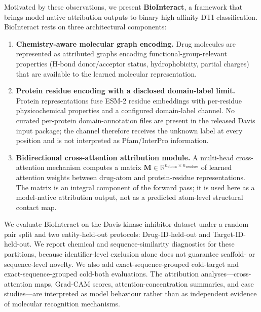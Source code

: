 \documentclass[fleqn,10pt]{wlscirep}
\begin{document}
Motivated by these observations, we present \textbf{BioInteract}, a framework
that brings model-native attribution outputs to binary high-affinity DTI
classification.  BioInteract rests on three architectural components:

\begin{enumerate}[leftmargin=*]
\item \textbf{Chemistry-aware molecular graph encoding.}  Drug molecules are
  represented as attributed graphs encoding functional-group-relevant properties
  (H-bond donor/acceptor status, hydrophobicity, partial charges) that
  are available to the learned molecular representation.

\item \textbf{Protein residue encoding with a disclosed domain-label limit.}
  Protein representations fuse ESM-2 residue embeddings with per-residue
  physicochemical properties and a configured domain-label channel. No curated
  per-protein domain-annotation files are present in the released Davis input
  package; the channel therefore receives the unknown label at every position
  and is not interpreted as Pfam/InterPro information.

\item \textbf{Bidirectional cross-attention attribution module.}  A multi-head
  cross-attention mechanism computes a matrix
  $\mathbf{M} \in \mathbb{R}^{n_\text{atoms} \times n_\text{residues}}$ of
  learned attention weights between drug-atom and protein-residue
  representations.  The matrix is an integral component of the forward pass;
  it is used here as a model-native attribution output, not as a predicted
  atom-level structural contact map.
\end{enumerate}

We evaluate BioInteract on the Davis kinase inhibitor
dataset\cite{davis2011comprehensive} under a random pair split and two
entity-held-out protocols: Drug-ID-held-out and Target-ID-held-out. We report
chemical and sequence-similarity
diagnostics for these partitions, because identifier-level exclusion alone does
not guarantee scaffold- or sequence-level novelty.  We also add
exact-sequence-grouped cold-target and exact-sequence-grouped cold-both
evaluations.  The attribution
analyses---cross-attention maps, Grad-CAM scores, attention-concentration
summaries, and case studies---are interpreted as model behaviour rather than as
independent evidence of molecular recognition mechanisms.

\end{document}
